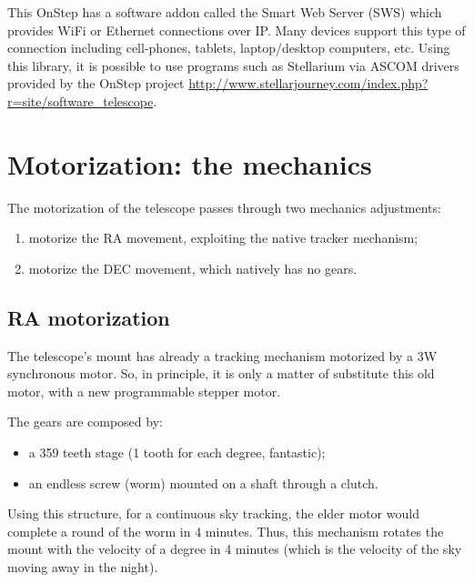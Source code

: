 \documentclass{article}
\begin{document}
\begin{multicols}{2}
        This OnStep has a software addon called the Smart Web Server (SWS) which provides WiFi or Ethernet connections over IP.
        Many devices support this type of connection including cell-phones, tablets, laptop/desktop computers, etc.
        Using this library, it is possible to use programs such as Stellarium via ASCOM drivers provided by the OnStep project \url{http://www.stellarjourney.com/index.php?r=site/software_telescope}.

        \section{Motorization: the mechanics}
        The motorization of the telescope passes through two mechanics adjustments:
        \begin{enumerate}
            \item motorize the RA movement, exploiting the native tracker mechanism;
            \item motorize the DEC movement, which natively has no gears.
        \end{enumerate}

        \subsection{RA motorization}
        The telescope's mount has already a tracking mechanism motorized by a 3W synchronous motor.
        So, in principle, it is only a matter of substitute this old motor, with a new programmable stepper motor.

        The gears are composed by:
        \begin{itemize}
            \item a 359 teeth stage (1 tooth for each degree, fantastic);
            \item an endless screw (worm) mounted on a shaft through a clutch.
        \end{itemize}
        Using this structure, for a continuous sky tracking, the elder motor would complete a round of the worm in 4 minutes.
        Thus, this mechanism rotates the mount with the velocity of a degree in 4 minutes (which is the velocity of the sky moving away in the night).


\end{multicols}
\end{document}
